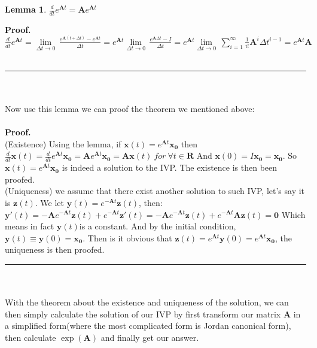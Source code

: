 \documentclass[a4paper]{article}
\newtheorem{lemma}[theorem]{Lemma}
\newenvironment{proof}[1][Proof]{\textbf{#1.} }{\ \rule{0.5em}{0.5em}}
\begin{document}
\begin{lemma}
$\frac{d}{dt}{{e}^{\mathbf{A}t}}=\mathbf{A}{{e}^{\mathbf{A}t}}$
\end{lemma}
\begin{proof}\\
$\frac{d}{dt}{{e}^{\mathbf{A}t}}=\underset{\Delta t\to 0}{\mathop{\lim }}\,\frac{{{e}^{\mathbf{A}(t+\Delta t)}}-{{e}^{\mathbf{A}t}}}{\Delta t}={{e}^{\mathbf{A}t}}\underset{\Delta t\to 0}{\mathop{\lim }}\,\frac{{{e}^{\mathbf{A}\Delta t}}-I}{\Delta t}={{e}^{\mathbf{A}t}}\underset{\Delta t\to 0}{\mathop{\lim }}\,\sum\limits_{i=1}^{\infty }{\frac{1}{i!}{{\mathbf{A}}^{i}}\Delta {{t}^{i-1}}}={{e}^{\mathbf{A}t}}\mathbf{A}$
\end{proof}
\\\\
Now use this lemma we can proof the theorem we mentioned above:\\\\
\begin{proof}
\\(Existence) Using the lemma, if $\mathbf{x}(t)={{e}^{\mathbf{A}t}}{{\mathbf{x}}_{\mathbf{0}}}$ then
$\frac{d}{dt}\mathbf{x}(t)=\frac{d}{dt}{{e}^{\mathbf{A}t}}{{\mathbf{x}}_{\mathbf{0}}}=\mathbf{A}{{e}^{\mathbf{A}t}}{{\mathbf{x}}_{\mathbf{0}}}=\mathbf{Ax}(t)\ for\ \forall t\in \mathbf{R}$
And $\mathbf{x}(0)=I{{\mathbf{x}}_{\mathbf{0}}}={{\mathbf{x}}_{\mathbf{0}}}$. So $\mathbf{x}(t)={{e}^{\mathbf{A}t}}{{\mathbf{x}}_{\mathbf{0}}}$ is indeed a solution to the IVP. The existence is then been proofed.
\\(Uniqueness) we assume that there exist another solution to such IVP, let’s say it is $\mathbf{z}(t)$. We let $\mathbf{y}(t)={{e}^{-\mathbf{A}t}}\mathbf{z}(t)$, then:
$\mathbf{y}'(t)=-\mathbf{A}{{e}^{-\mathbf{A}t}}\mathbf{z}(t)+{{e}^{-\mathbf{A}t}}\mathbf{z}'(t)=-\mathbf{A}{{e}^{-\mathbf{A}t}}\mathbf{z}(t)+{{e}^{-\mathbf{A}t}}\mathbf{Az}(t)=\mathbf{0}$
Which means in fact $\mathbf{y}(t)$is a constant. And by the initial condition, $\mathbf{y}(t)\equiv \mathbf{y}(0)={{\mathbf{x}}_{\mathbf{0}}}$. Then is it obvious that $\mathbf{z}(t)={{e}^{\mathbf{A}t}}\mathbf{y}(0)={{e}^{\mathbf{A}t}}{{\mathbf{x}}_{\mathbf{0}}}$, the uniqueness is then proofed.
\end{proof}
\\\\
With the theorem about the existence and uniqueness of the solution, we can then simply calculate the solution of our IVP by first transform our matrix $\mathbf{A}$ in a simplified form(where the most complicated form is Jordan canonical form), then calculate $\exp (\mathbf{A})$ and finally get our answer.
\end{document}
